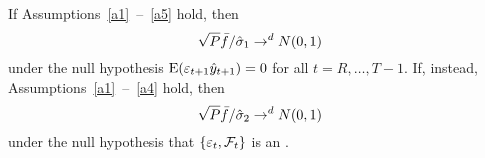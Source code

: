If Assumptions~\ref{a1}~--~\ref{a5} hold, then
\begin{equation*}
  \sqrt{P} \bar{f} / \hat\sigma_1 \to^d N(0, 1)
\end{equation*}
under the null hypothesis  $\operatorname{E}(\varepsilon_{t+1} \hat{y}_{t+1}) = 0$ for all $t = R,\dots,T-1$.
If, instead, Assumptions~\ref{a1}~--~\ref{a4} hold, then
\begin{equation*}
  \sqrt{P} \bar{f} / \hat\sigma_2 \to^d N(0, 1)
\end{equation*}
under the null hypothesis that $\{\varepsilon_t, \mathcal{F}_t\}$ is an \mds.
